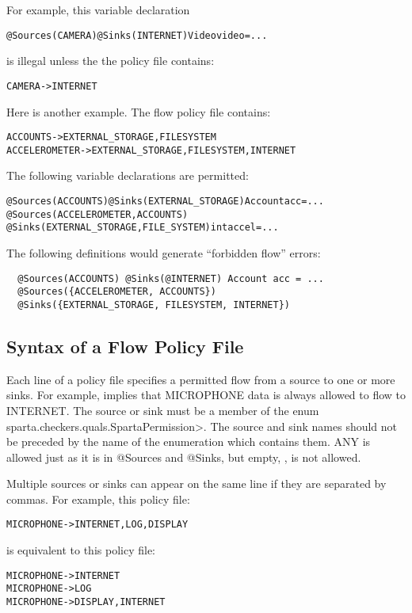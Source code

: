 For example, this variable declaration

\begin{alltt}
@Sources(CAMERA) @Sinks(INTERNET) Video video = ...
\end{alltt}

\noindent
is illegal unless the the policy file contains:

\begin{alltt}
CAMERA -> INTERNET
\end{alltt}

Here is another example.
The flow policy file contains:
\begin{alltt}
  ACCOUNTS      -> EXTERNAL_STORAGE, FILESYSTEM
  ACCELEROMETER -> EXTERNAL_STORAGE, FILESYSTEM, INTERNET
\end{alltt}

The following variable declarations are permitted:
\begin{alltt}
  @Sources(ACCOUNTS) @Sinks(EXTERNAL_STORAGE) Account acc = ...
  @Sources({ACCELEROMETER, ACCOUNTS})
  @Sinks({EXTERNAL_STORAGE, FILE_SYSTEM}) int accel = ...
\end{alltt}

The following definitions would generate ``forbidden flow'' errors:
\begin{Verbatim}
  @Sources(ACCOUNTS) @Sinks(@INTERNET) Account acc = ...
  @Sources({ACCELEROMETER, ACCOUNTS})
  @Sinks({EXTERNAL_STORAGE, FILESYSTEM, INTERNET})
\end{Verbatim}


\subsection{Syntax of a Flow Policy File}

Each line of a policy file specifies a permitted flow from a source to one
or more sinks.  For example,
 implies that
MICROPHONE data is always allowed to flow to INTERNET.
The source or sink must be a member of the enum
\<sparta.checkers.quals.SpartaPermission>.  The source 
and sink names should not be preceded by the name of the enumeration which contains them.
ANY is allowed just as it is in @Sources and @Sinks, but empty, \ttcbs, is not allowed.

Multiple sources or sinks can appear on the same line if they are separated by commas. 
For example,
this policy file:
\begin{alltt}
   MICROPHONE -> INTERNET, LOG, DISPLAY
\end{alltt}
is equivalent to this policy file:
\begin{alltt}
   MICROPHONE -> INTERNET
   MICROPHONE -> LOG
   MICROPHONE -> DISPLAY, INTERNET
\end{alltt}

